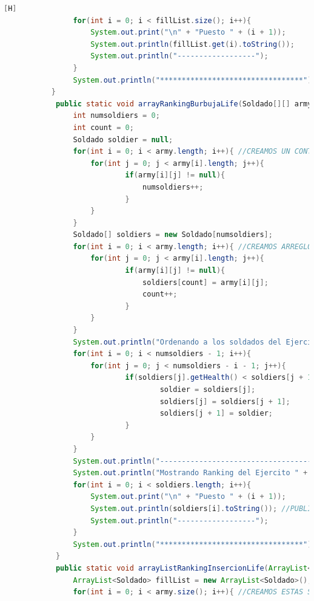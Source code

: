 \documentclass{article}
\begin{document}
\begin{lstlisting}[language=java,caption={Las lineas de codigos del metodo creado:}][H]
				for(int i = 0; i < fillList.size(); i++){
					System.out.print("\n" + "Puesto " + (i + 1));
					System.out.println(fillList.get(i).toString());
					System.out.println("------------------");
				}
				System.out.println("*********************************");
		   }
			public static void arrayRankingBurbujaLife(Soldado[][] army, int num){
				int numsoldiers = 0;
				int count = 0;
				Soldado soldier = null;
				for(int i = 0; i < army.length; i++){ //CREAMOS UN CONTADOR PARA SABER EL NUMERO DE SOLDADOS DE ESTE EJERCITO Y DESPUES CREAR UN ARREGLO EL CUAL PODEAMOS DARLE ESTE TAMAÑO Y LO PODAMOS USAR PARA EL METODO BURBUJA
					for(int j = 0; j < army[i].length; j++){
							if(army[i][j] != null){
								numsoldiers++;
							}
					}
				}
				Soldado[] soldiers = new Soldado[numsoldiers];
				for(int i = 0; i < army.length; i++){ //CREAMOS ARREGLO PARA QUE LOS SOLDADOS SE TRASLADEN DE UN ARREGLO BIDIMENSIONAL A UNO UNIDIMENSIONAL PARA APLICAR EL METODO BURBUJA
					for(int j = 0; j < army[i].length; j++){
							if(army[i][j] != null){
								soldiers[count] = army[i][j];
								count++;
							}
					}
				}
				System.out.println("Ordenando a los soldados del Ejercito " + num + " por el metodo burbuja: ");//APLICAMOS EL METODO BURBUJA CON LOS PUNTOS DE VIDA
				for(int i = 0; i < numsoldiers - 1; i++){
					for(int j = 0; j < numsoldiers - i - 1; j++){
							if(soldiers[j].getHealth() < soldiers[j + 1].getHealth()){
									soldier = soldiers[j];
									soldiers[j] = soldiers[j + 1];
									soldiers[j + 1] = soldier;
							}
					}      
				}
				System.out.println("------------------------------------------");
				System.out.println("Mostrando Ranking del Ejercito " + num + " ..... ////// --->"); //DAMOS A CONOCER EL RANKING DE ESTE EJERCITO  EL CUAL LO PUBLICAMOS MEDIANTE PUESTOS 
				for(int i = 0; i < soldiers.length; i++){
					System.out.print("\n" + "Puesto " + (i + 1));
					System.out.println(soldiers[i].toString()); //PUBLICAMOS INFORMACION DE CADA SOLDADO
					System.out.println("------------------");
				}
				System.out.println("*********************************");
			}
			public static void arrayListRankingInsercionLife(ArrayList<ArrayList<Soldado>> army, int num){
				ArrayList<Soldado> fillList = new ArrayList<Soldado>(); //CREAMOS ESTE ARRAYLIST PARA PODER GUARDAR A LOS SOLDADOS EN UN SOLO ARRAYLIST EL CUAL SEA EFECTIVO EL METODO INSERCION 
				for(int i = 0; i < army.size(); i++){ //CREAMOS ESTAS SENTENCIAS PARA PODER VERIFICAR EL NUMERO DE SOLDADOS Y TAMBIEN AÑADIRLO EN EL ARRAYLIST CREADO PARA DESPUES PONER EL RANKING DE PUESTOS DE CADA UNO DE ESTOS SOLDADOS

\end{lstlisting}
\end{document}
